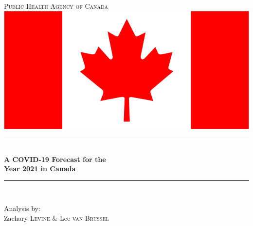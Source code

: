 \documentclass[12pt]{article}\usepackage[]{graphicx}\usepackage[]{color}
\begin{document}

\newpage


\begin{titlepage}

\newcommand{\HRule}{\rule{\linewidth}{0.5mm}} 

\center

\textsc{\LARGE Public Health Agency of Canada}\\[0.5em]
\includegraphics[scale=0.08]{images/phacflag.png}\\[1.5cm] %
\HRule \\[0.4cm]
{ \huge \bfseries A COVID-19 Forecast for the \\[0.3em] Year 2021 in Canada}\\[0.4cm]
\HRule \\[1.5cm]
\vfill
\begin{minipage}{0.5\textwidth}
\begin{center}
Analysis by:\\
\large
Zachary \textsc{Levine} \& Lee \textsc{van Brussel}
\end{center}
\end{minipage}\\[4cm]
\end{titlepage}
\newpage
{} %
\tableofcontents
\newpage


\end{document}

